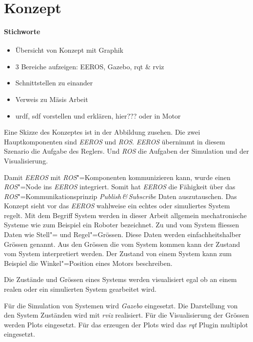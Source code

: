 \chapter{Konzept}
\subsubsection*{Stichworte}
\begin{itemize}
\item Übersicht von Konzept mit Graphik
\item 3 Bereiche aufzeigen: EEROS, Gazebo, rqt \& rviz
\item Schnittstellen zu einander
\item Verweis zu Mäsis Arbeit
\item urdf, sdf vorstellen und erklären, hier??? oder in Motor
\end{itemize}

Eine Skizze des Konzeptes ist in der Abbildung %
zusehen.
Die zwei Hauptkomponenten sind \textit{EEROS} und \textit{ROS}.
\textit{EEROS} übernimmt in diesem Szenario die Aufgabe des Reglers.
Und \textit{ROS} die Aufgaben der Simulation und der Visualisierung.

Damit \textit{EEROS} mit \textit{ROS}"=Komponenten kommunizieren kann, wurde einen \textit{ROS}"=Node ins \textit{EEROS} integriert.
Somit hat \textit{EEROS} die Fähigkeit über das \textit{ROS}"=Kommunikationsprinzip \textit{Publish\,\&\,Subscribe} Daten auszutauschen.
Das Konzept sieht vor das \textit{EEROS} wahlweise ein echtes oder simuliertes System regelt.
Mit dem Begriff System werden in dieser Arbeit allgemein mechatronische Systeme wie zum Beispiel ein Roboter bezeichnet.
Zu und vom System fliessen Daten wie Stell"= und Regel"=Grössen.
Diese Daten werden einfachheitshalber Grössen genannt.
Aus den Grössen die vom System kommen kann der Zustand vom System interpretiert werden.
Der Zustand von einem System kann zum Beispiel die Winkel"=Position eines Motors beschreiben.

Die Zustände und Grössen eines Systems werden visualisiert egal ob an einem realen oder ein simulierten System gearbeitet wird. %

Für die Simulation von Systemen wird \textit{Gazebo} eingesetzt.
Die Darstellung von den System Zuständen wird mit \textit{rviz} realisiert.
Für die Visualisierung der Grössen werden Plots eingesetzt.
Für das erzeugen der Plots wird das \textit{rqt} Plugin multiplot eingesetzt.

